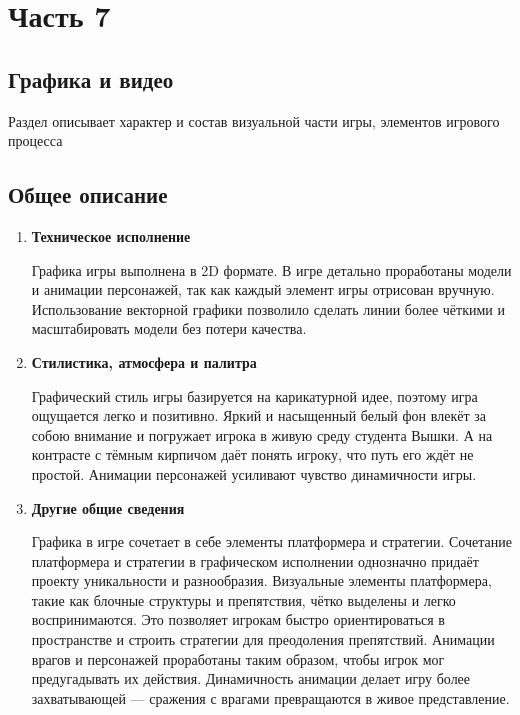 \documentclass{article}
\begin{document}
\section{Часть 7}

\subsection*{Графика и видео}
Раздел описывает характер и состав визуальной части игры, элементов игрового процесса

\subsection*{Общее описание}
    \begin{enumerate}
    \item \textbf{Техническое исполнение} \par
    Графика игры выполнена в 2D формате. В игре детально проработаны модели и анимации персонажей, так как каждый элемент игры отрисован вручную. Использование векторной графики позволило сделать линии более чёткими и масштабировать модели без потери качества.
    \item\textbf{Стилистика, атмосфера и палитра} \par
    Графический стиль игры базируется на карикатурной идее, поэтому игра ощущается легко и позитивно. Яркий и насыщенный белый фон влекёт за собою внимание и погружает игрока в живую среду студента Вышки. А на контрасте с тёмным кирпичом даёт понять игроку, что путь его ждёт не простой. Анимации персонажей усиливают чувство динамичности игры.
    \item \textbf{Другие общие сведения} \par
    Графика в игре сочетает в себе элементы платформера и стратегии. Сочетание платформера и стратегии в графическом исполнении однозначно придаёт проекту уникальности и разнообразия. Визуальные элементы платформера, такие как блочные структуры и препятствия, чётко выделены и легко воспринимаются. Это позволяет игрокам быстро ориентироваться в пространстве и строить стратегии для преодоления препятствий. Анимации врагов и персонажей проработаны таким образом, чтобы игрок мог предугадывать их действия. Динамичность анимации делает игру более захватывающей — сражения с врагами превращаются в живое представление.
    \end{enumerate}
\end{document}
